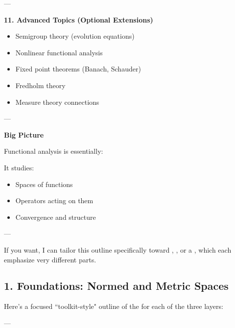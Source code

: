 \documentclass[12pt,a4paper]{report}
\begin{document}
\begin{description}
---

\item \textbf{11. Advanced Topics (Optional Extensions)}

\begin{itemize}
    \item Semigroup theory (evolution equations)
    \item Nonlinear functional analysis
    \item Fixed point theorems (Banach, Schauder)
    \item Fredholm theory
    \item Measure theory connections
\end{itemize}

---

\item \textbf{Big Picture}

Functional analysis is essentially:


It studies:

\begin{itemize}
    \item Spaces of functions
    \item Operators acting on them
    \item Convergence and structure
\end{itemize}

---
\end{description}

If you want, I can tailor this outline specifically toward , , or a , which each emphasize very different parts.

\newpage

\subsection*{1. Foundations: Normed and Metric Spaces}

Here’s a focused ``toolkit-style" outline of the  for each of the three layers:

---
\end{document}
